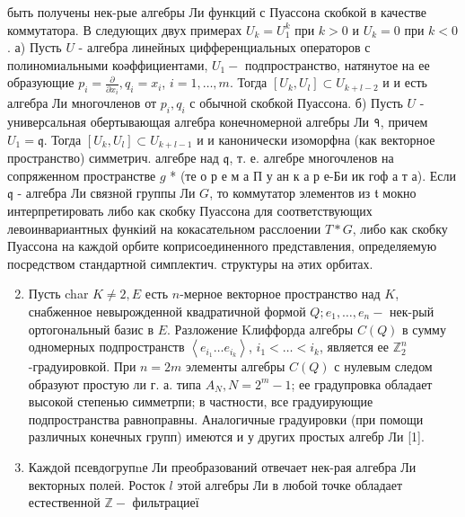 \documentclass[10pt]{article}
\begin{document}
быть получены нек-рые алгебры Ли функций с Пуассона скобкой в качестве коммутатора. В следующих двух примерах $U_{k}=U_{1}^{k}$ при $k>0$ и $U_{k}=0$ при $k<0$. а) Пусть $U$ - алгебра линейных цифференциальных операторов с полиномиальными коәффициентами, $U_{1}-$ подпространство, натянутое на ее образующие $p_{i}=\frac{\partial}{\partial x_{i}}, q_{i}=x_{i}$, $i=1, \ldots, m$. Тогда $\left[U_{k}, U_{l}\right] \subset U_{k+l-2}$ и и есть алгебра Ли многочленов от $p_{i}, q_{i}$ с обычной скобкой Пуассона. б) Пусть $U$ - универсальная обертывающая алгебра конечномерноӥ алгебры Ли १, причем $U_{1}=\mathfrak{q}$. Тогда $\left[U_{k}, U_{l}\right] \subset U_{k+l-1}$ и и канонически изоморфна (как векторное пространство) симметрич. алгебре над $\mathfrak{q}$, т. е. алгебре многочленов на сопряженном пространстве $g$ * (те о р е м а П у ан к а р е-Би ик гоф а т а). Если $\mathfrak{q}$ - алгебра Ли связной группы Ли $G$, то коммутатор элементов из $\mathfrak{t}$ мокно интерпретировать либо как скобку Пуассона для соответствующих левоинвариантных функіий на кокасательном расслоении $T * G$, либо как скобку Пуассона на каждой орбите коприсоединенного представления, определяемую посредством стандартной симплектич. структуры на әтих орбитах.



\begin{enumerate}

  \setcounter{enumi}{1}

  \item Пусть char $K \neq 2, E$ есть $n$-мерное векторное пространство над $K$, снабженное невырожденной квадратичной формой $Q ; e_{1}, \ldots, e_{n}-$ нек-рый ортогональный базис в $E$. Разложение Kлиффорда алгебры $C(Q)$ в сумму одномерных подпространств $\left\langle e_{i_{1}} \ldots e_{i_{k}}\right\rangle$, $i_{1}<\ldots<i_{k}$, является ее $\mathbb{Z}_{2}^{n}$-градуировкой. При $n=2 m$ элементы алгебры $C(Q)$ с нулевым следом образуют простую ли г. а. типа $A_{N}, N=2^{m}-1$; ее градупровка обладает высокой степенью симметрпи; в частности, все градуирующие подпространства равноправны. Аналогичные градуировки (при помощи различных конечных групп) имеются и у других простых алгебр Ли [1].



  \item Каждой псевдогрупnе Ли преобразований отвечает нек-рая алгебра Ли векторных полеӥ. Росток $l$ этой алгебры Ли в любой точке обладает естественной $\mathbb{Z}-$ фильтрациеї



\end{enumerate}
\end{document}
